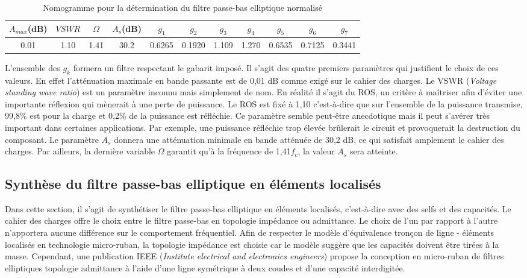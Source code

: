 \documentclass[french]{article}
\begin{document}
\begin{table}[H]
	\centering
	\begin{tabular}{|c|c|c|c|c|c|c|c|c|c|c|}
		\hline
		$A_{max}$(dB) & $VSWR$ & $\Omega$ & $A_s$(dB) & $g_1$ & $g_2$ & $g_3$ & $g_4$ & $g_5$ & $g_6$ & $g_7$\\
		\hline
		0.01 & 1.10 & 1.41 & 30.2 & 0.6265 & 0.1920 & 1.109 & 1.270 & 0.6535 & 0.7125 & 0.3441\\
		\hline
	\end{tabular}
	\caption{Nomogramme pour la détermination du filtre passe-bas elliptique normalisé}
	\label{tab:nomogramme_elliptique}
\end{table}

L'ensemble des $g_k$ formera un filtre respectant le gabarit imposé. Il s'agit des quatre premiers paramètres qui justifient le choix de ces valeurs. En effet l'atténuation maximale en bande passante est de 0,01 dB comme exigé sur le cahier des charges. Le VSWR (\textit{Voltage standing wave ratio}) est un paramètre inconnu mais simplement de nom. En réalité il s'agit du ROS, un critère à maîtriser afin d'éviter une importante réflexion qui mènerait à une perte de puissance. Le ROS est fixé à 1,10 c'est-à-dire que sur l'ensemble de la puissance transmise, 99,8\% est pour la charge et 0,2\% de la puissance est réfléchie. Ce paramètre semble peut-être anecdotique mais il peut s'avérer très important dans certaines applications. Par exemple, une puissance réfléchie trop élevée brûlerait le circuit et provoquerait la destruction du composant. Le paramètre $A_s$ donnera une atténuation minimale en bande atténuée de 30,2 dB, ce qui satisfait amplement le cahier des charges. Par ailleurs, la dernière variable $\Omega$ garantit qu'à la fréquence de 1,41$f_c$, la valeur $A_s$ sera atteinte.

\newpage

\subsection{Synthèse du filtre passe-bas elliptique en éléments localisés}

Dans cette section, il s'agit de synthétiser le filtre passe-bas elliptique en éléments localisés, c'est-à-dire avec des selfs et des capacités. Le cahier des charges offre le choix entre le filtre passe-bas en topologie impédance ou admittance. Le choix de l'un par rapport à l'autre n'apportera aucune différence sur le comportement fréquentiel. Afin de respecter le modèle d'équivalence tronçon de ligne - éléments localisés en technologie micro-ruban, la topologie impédance est choisie car le modèle suggère que les capacités doivent être tirées à la masse. Cependant, une publication IEEE (\textit{Institute electrical and electronics engineers}) propose la conception en micro-ruban de filtres elliptiques topologie admittance à l'aide d'une ligne symétrique à deux coudes et d'une capacité interdigitée.
\end{document}
